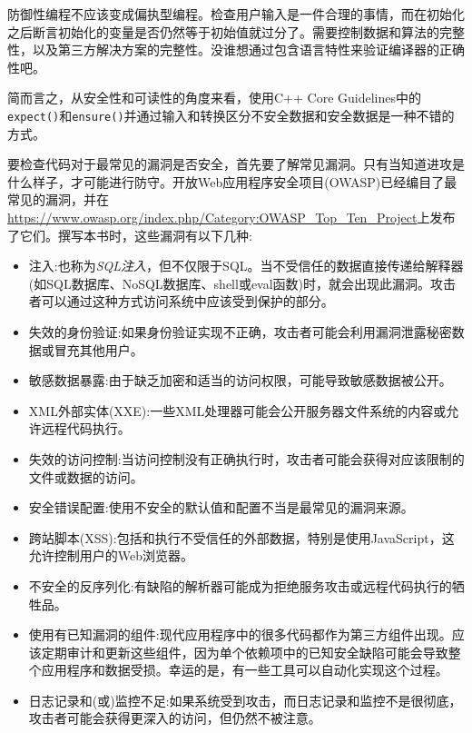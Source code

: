 防御性编程不应该变成偏执型编程。检查用户输入是一件合理的事情，而在初始化之后断言初始化的变量是否仍然等于初始值就过分了。需要控制数据和算法的完整性，以及第三方解决方案的完整性。没谁想通过包含语言特性来验证编译器的正确性吧。

简而言之，从安全性和可读性的角度来看，使用C++ Core Guidelines中的\texttt{expect()}和\texttt{ensure()}并通过输入和转换区分不安全数据和安全数据是一种不错的方式。


要检查代码对于最常见的漏洞是否安全，首先要了解常见漏洞。只有当知道进攻是什么样子，才可能进行防守。开放Web应用程序安全项目(OWASP)已经编目了最常见的漏洞，并在\url{https://www.owasp.org/index.php/Category:OWASP\_Top\_Ten\_Project}上发布了它们。撰写本书时，这些漏洞有以下几种:

\begin{itemize}
\item 
注入:也称为\textit{SQL注入}，但不仅限于SQL。当不受信任的数据直接传递给解释器(如SQL数据库、NoSQL数据库、shell或eval函数)时，就会出现此漏洞。攻击者可以通过这种方式访问系统中应该受到保护的部分。

\item 
失效的身份验证:如果身份验证实现不正确，攻击者可能会利用漏洞泄露秘密数据或冒充其他用户。

\item 
敏感数据暴露:由于缺乏加密和适当的访问权限，可能导致敏感数据被公开。

\item 
XML外部实体(XXE):一些XML处理器可能会公开服务器文件系统的内容或允许远程代码执行。

\item 
失效的访问控制:当访问控制没有正确执行时，攻击者可能会获得对应该限制的文件或数据的访问。

\item 
安全错误配置:使用不安全的默认值和配置不当是最常见的漏洞来源。

\item 
跨站脚本(XSS):包括和执行不受信任的外部数据，特别是使用JavaScript，这允许控制用户的Web浏览器。

\item 
不安全的反序列化:有缺陷的解析器可能成为拒绝服务攻击或远程代码执行的牺牲品。

\item 
使用有已知漏洞的组件:现代应用程序中的很多代码都作为第三方组件出现。应该定期审计和更新这些组件，因为单个依赖项中的已知安全缺陷可能会导致整个应用程序和数据受损。幸运的是，有一些工具可以自动化实现这个过程。

\item 
日志记录和(或)监控不足:如果系统受到攻击，而日志记录和监控不是很彻底，攻击者可能会获得更深入的访问，但仍然不被注意。
\end{itemize}

